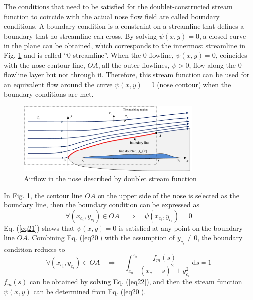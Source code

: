 The conditions that need to be satisfied for the doublet-constructed stream function to coincide with the actual nose flow field are called boundary conditions. A boundary condition is a constraint on a streamline that defines a boundary that no streamline can cross. By solving $\psi(x,y)=0$, a closed curve in the plane can be obtained, which corresponds to the innermost streamline in Fig. \ref{fig4} and is called ``0 streamline''. When the 0-flowline, $\psi(x,y)=0$, coincides with the nose contour line, $OA$, all the outer flowlines, $\psi>0$, flow along the 0-flowline layer but not through it. Therefore, this stream function can be used for an equivalent flow around the curve $\psi(x,y)=0$ (nose contour) when the boundary conditions are met.
\begin{figure}[th]
	\centering
	\includegraphics[width=0.8\textwidth]{Figures/Figs_Ch4/fig4.pdf}
	\caption{Airflow in the nose described by doublet stream function}\label{fig4}
\end{figure}

In Fig. \ref{fig4}, the contour line $OA$ on the upper side of the nose is selected as the boundary line, then the boundary condition can be expressed as
\begin{equation}\label{eq21}
\forall\left(x_{c_i}, y_{c_i}\right) \in O A \quad \Rightarrow \quad \psi\left(x_{c_i}, y_{c_i}\right)=0
\end{equation}
Eq. (\ref{eq21}) shows that $\psi(x,y)=0$ is satisfied at any point on the boundary line $OA$. Combining Eq. (\ref{eq20}) with the assumption of $y_{c_i}\neq0$, the boundary condition reduces to
\begin{equation}\label{eq22}
\forall\left(x_{c_i}, y_{c_i}\right) \in O A \quad \Rightarrow \quad \int_{x_a}^{x_b} \frac{f_m(s)}{\left(x_{c_i}-s\right)^2+y_{c_i}^2} \mathrm{~d} s=1
\end{equation}
$f_m(s)$ can be obtained by solving Eq. (\ref{eq22}), and then the stream function $\psi(x,y)$ can be determined from Eq. (\ref{eq20}).

